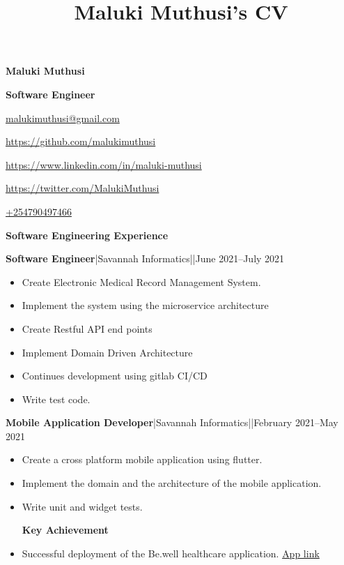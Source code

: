 \documentclass[a4paper]{article}
\begin{document}
\title{Maluki Muthusi's CV}

\begin{center}
    {\Large \textbf{Maluki Muthusi}} \par

    {\large \textbf{Software Engineer}}
\end{center}

\begin{description}[noitemsep]
    \item[\textbf{Email:}] \href{mailto:malukimuthusi@gmail.com}{malukimuthusi@gmail.com}
    \item[\textbf{Github:}] \url{https://github.com/malukimuthusi}
        \item[\textbf{LinkedIn:}]\url{https://www.linkedin.com/in/maluki-muthusi}
        \item[\textbf{Twitter:}]\url{https://twitter.com/MalukiMuthusi}
        \item[\textbf{Contact:}]\url{+254790497466}
\end{description}


\begin{center}
    {\Large \textbf{Software Engineering Experience}}
\end{center}

\textbf{Software Engineer}|Savannah Informatics||June 2021--July 2021

\begin{itemize}[noitemsep]
    \item Create Electronic Medical Record Management System.
    \item Implement the system using the microservice architecture
    \item Create Restful API end points
    \item Implement Domain Driven Architecture
    \item Continues development using gitlab CI/CD
    \item Write test code.
\end{itemize}

\textbf{Mobile Application Developer}|Savannah Informatics||February 2021--May 2021

\begin{itemize}[noitemsep]
    \item Create a cross platform mobile application using flutter.
    \item Implement the domain and the architecture of the mobile application.
    \item Write unit and widget tests.
          \begin{center}
              \textbf{Key Achievement}
          \end{center}
    \item Successful deployment of the Be.well healthcare application. \href{https://play.google.com/store/apps/details?id=com.savannah.bewell}{App link}
\end{itemize}
\end{document}

